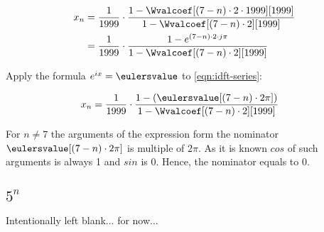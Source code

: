 \documentclass[a4paper]{article}
\theoremstyle{break}
\theoremstyle{break}
\begin{document}
\begin{equation} \label{eqn:idft-series}
  \begin{split}
    x_n &= \frac{1}{1999} \cdot
           \frac{1 - \Wvalcoef[(7 - n) \cdot 2 \cdot 1999][1999]}{1 - \Wvalcoef[(7 - n) \cdot 2][1999]} \\
        &= \frac{1}{1999} \cdot
           \frac{1 - e^{(7 - n) \cdot 2 \cdot j \pi}}{1 - \Wvalcoef[(7 - n) \cdot 2][1999]}
  \end{split}
\end{equation}

Apply the formula $e^{ix} = \eulersvalue$ to \eqref{eqn:idft-series}:

\begin{equation*}
  \begin{split}
    x_n &= \frac{1}{1999} \cdot
           \frac{1 - (\eulersvalue[(7 - n) \cdot 2 \pi])}{1 - \Wvalcoef[(7 - n) \cdot 2][1999]}
  \end{split}
\end{equation*}

For $n \neq 7$ the arguments of the expression form the nominator $\eulersvalue[(7 - n) \cdot 2 \pi]$ is multiple of $2\pi$. As it is known $cos$ of such arguments is always 1 and $sin$ is 0. Hence, the nominator equals to 0.


\subsection{$5^n$}

Intentionally left blank... for now...


\end{document}
